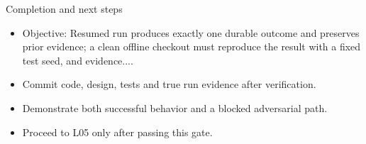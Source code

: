 \documentclass[aspectratio=169,10pt]{beamer}
\begin{document}
\begin{frame}{Completion and next steps}
\small
\begin{itemize}
\item Objective: Resumed run produces exactly one durable outcome and preserves prior evidence; a clean offline checkout must reproduce the result with a fixed test seed, and evidence....
\item Commit code, design, tests and true run evidence after verification.
\item Demonstrate both successful behavior and a blocked adversarial path.
\item Proceed to L05 only after passing this gate.
\end{itemize}

\end{frame}
\end{document}
